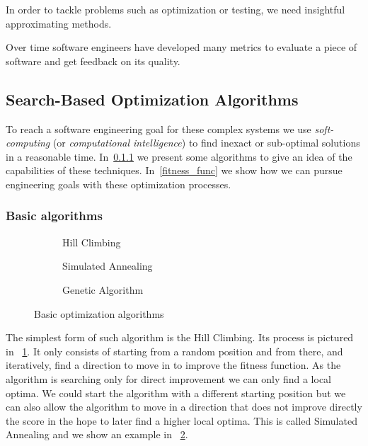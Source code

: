 \documentclass[11pt]{sdm}
\begin{document}
In order to tackle problems such as optimization or testing, we need insightful approximating methods.

Over time software engineers have developed many metrics to evaluate a piece of software and get feedback on its quality.

\subsection{Search-Based Optimization Algorithms}
\label{example_algo}

To reach a software engineering goal for these complex systems we use \textit{soft-computing} (or \textit{computational intelligence}) to find inexact or sub-optimal solutions in a reasonable time.
In~\ref{basic_algo} we present some algorithms to give an idea of the capabilities of these techniques.
In~\ref{fitness_func} we show how we can pursue engineering goals with these optimization processes.

\subsubsection{Basic algorithms}
\label{basic_algo}

\begin{figure}
  \centering
  \begin{subfigure}[b]{}
\caption{Hill Climbing}
\label{fig:hill_climbing}
  \end{subfigure}
  \begin{subfigure}[b]{}
\caption{Simulated Annealing}
\label{fig:simulated_annealing}
  \end{subfigure}
  \begin{subfigure}[b]{}
\caption{Genetic Algorithm}
\label{fig:genetic_algo}
  \end{subfigure}
\caption{Basic optimization algorithms}
\label{fig:optimization_algos}
\end{figure}

The simplest form of such algorithm is the Hill Climbing.
Its process is pictured in \figurename~\ref{fig:hill_climbing}.
It only consists of starting from a random position and from there, and iteratively, find a direction to move in to improve the fitness function.
As the algorithm is searching only for direct improvement we can only find a local optima.
We could start the algorithm with a different starting position but we can also allow the algorithm to move in a direction that does not improve directly the score in the hope to later find a higher local optima.
This is called Simulated Annealing and we show an example in \figurename~\ref{fig:simulated_annealing}.
\end{document}
